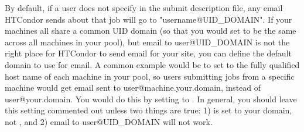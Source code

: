 \begin{description}
\label{param:EmailDomain}
\item[\Macro{EMAIL\_DOMAIN}]
  By default, if a user does not specify  in the
  submit description file, any email HTCondor sends about that job will
  go to "username@UID\_DOMAIN".
  If your machines all share a common UID domain (so that you would
  set  to be the same across all machines in your
  pool), but email to user@UID\_DOMAIN is not the right place for
  HTCondor to send email for your site, you can define the default
  domain to use for email.
  A common example would be to set  to the fully
  qualified host name of each machine in your pool, so users submitting
  jobs from a specific machine would get email sent to
  user@machine.your.domain, instead of user@your.domain.  
  You would do this by setting  to
  . 
  In general, you should leave this setting commented out unless two
  things are true: 1)  is set to your domain, not
  , and 2) email to user@UID\_DOMAIN will not 
  work. 
  

\end{description}
